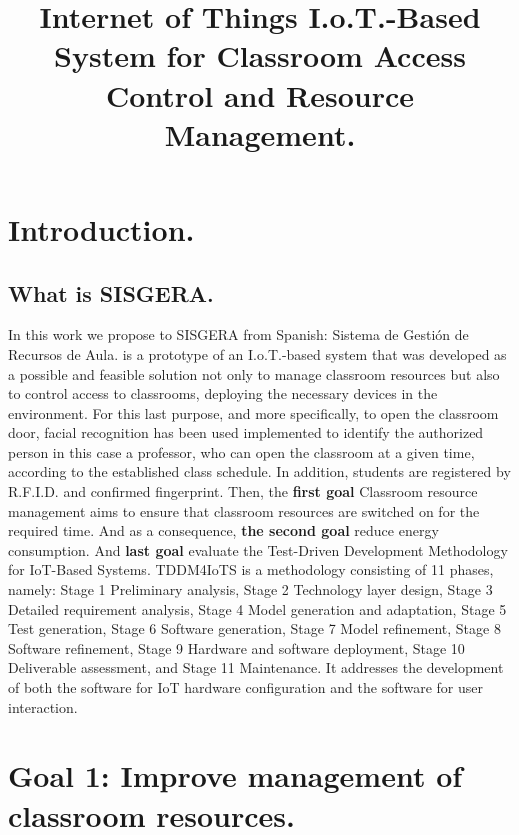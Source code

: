 \documentclass[]{scrartcl}
\title{Internet of Things I.o.T.-Based System for Classroom Access Control and Resource Management.}
\begin{document}
\maketitle

\begin{abstract}

\end{abstract}

\section*{Introduction.}
	\subsection*{What is SISGERA.}
	In this work we propose to SISGERA from Spanish: Sistema de Gestión de Recursos de Aula. is a prototype of an I.o.T.-based system that was developed as a possible and feasible solution not only to manage classroom resources but also to control access to classrooms, deploying the necessary devices in the environment. For this last purpose, and more specifically, to open the classroom door, facial recognition has been used implemented to identify the authorized person in this case a professor, who can open the classroom at a given time, according to the established class schedule. In addition, students are registered by R.F.I.D. and confirmed fingerprint. Then, the \textbf{first goal} Classroom resource management aims to ensure that classroom resources are switched on for the required time. And as a consequence, \textbf{the second goal} reduce energy consumption. And \textbf{last goal} evaluate the Test-Driven Development Methodology for IoT-Based Systems. TDDM4IoTS is a methodology consisting of 11 phases, namely: Stage 1 Preliminary analysis, Stage 2 Technology layer design, Stage 3 Detailed requirement analysis, Stage 4 Model generation and adaptation, Stage 5 Test generation, Stage 6 Software generation, Stage 7 Model refinement, Stage 8 Software refinement, Stage 9 Hardware and software deployment, Stage 10 Deliverable assessment, and Stage 11 Maintenance. It addresses the development of both the software for IoT hardware configuration and the software for user interaction.
\section*{Goal 1: Improve management of classroom resources.}
\end{document}
